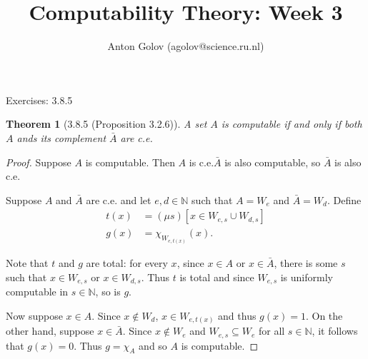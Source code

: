 \documentclass{article}
\title{Computability Theory: Week 3}
\author{Anton Golov (agolov@science.ru.nl)}
\newtheorem{theorem}{Theorem}
\begin{document}
  \maketitle

  Exercises: 3.8.5

  \begin{theorem}[3.8.5 (Proposition 3.2.6)]
    A set $A$ is computable if and only if both $A$ ands its complement $\bar A$ are c.e.
  \end{theorem}

  \begin{proof}
    Suppose $A$ is computable.  Then $A$ is c.e.\@and $\bar A$ is also computable, so $\bar A$ is also c.e.

    Suppose $A$ and $\bar A$ are c.e. and let $e, d \in \mathbb{N}$ such that $A = W_e$ and $\bar A = W_d$.
    Define
    \begin{align*}
      t(x) &= (\mu s)[x \in W_{e, s} \cup W_{d, s}]\\
      g(x) &= \chi_{W_{e, t(x)}}(x).
    \end{align*}

    Note that $t$ and $g$ are total: for every $x$, since $x \in A$ or $x \in \bar A$, there is some $s$ such that
    $x \in W_{e,s}$ or $x \in W_{d,s}$.  Thus $t$ is total and since $W_{e,s}$ is uniformly computable in
    $s \in \mathbb{N}$, so is $g$.

    Now suppose $x \in A$.  Since $x \not \in W_d$, $x \in W_{e,t(x)}$ and thus $g(x) = 1$.  On the other hand, suppose
    $x \in \bar A$.  Since $x \not \in W_e$ and $W_{e, s} \subseteq W_e$ for all $s \in \mathbb{N}$, it follows that
    $g(x) = 0$.  Thus $g = \chi_A$ and so $A$ is computable.
  \end{proof}
\end{document}
